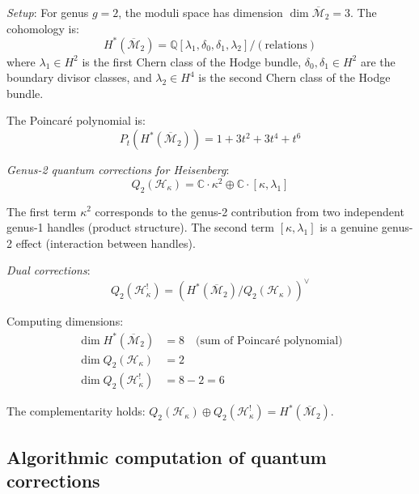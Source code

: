 \begin{example}
\label{ex:heisenberg-genus-2-complementarity}

\emph{Setup}: For genus $g=2$, the moduli space has dimension $\dim \overline{
\mathcal{M}}_2 = 3$. The cohomology is:
\begin{equation}
H^*(\overline{\mathcal{M}}_2) = \mathbb{Q}[\lambda_1, \delta_0, \delta_1, \lambda_2] / (\text{relations})
\end{equation}
where $\lambda_1 \in H^2$ is the first Chern class of the Hodge bundle,
$\delta_0, \delta_1 \in H^2$ are the boundary divisor classes, and
$\lambda_2 \in H^4$ is the second Chern class of the Hodge bundle.

The Poincaré polynomial is:
\begin{equation}
P_t(H^*(\overline{\mathcal{M}}_2)) = 1 + 3t^2 + 3t^4 + t^6
\end{equation}

\emph{Genus-2 quantum corrections for Heisenberg}:
\begin{equation}
Q_2(\mathcal{H}_\kappa) = \mathbb{C} \cdot \kappa^2 \oplus \mathbb{C} \cdot [\kappa, 
\lambda_1]
\end{equation}

The first term $\kappa^2$ corresponds to the genus-2 contribution from two independent 
genus-1 handles (product structure). The second term $[\kappa, \lambda_1]$ is a 
genuine genus-2 effect (interaction between handles).

\emph{Dual corrections}:
\begin{equation}
Q_2(\mathcal{H}_\kappa^!) = \left(H^*(\overline{\mathcal{M}}_2) / Q_2(\mathcal{H}_\kappa)
\right)^\vee
\end{equation}

Computing dimensions:
\begin{align}
\dim H^*(\overline{\mathcal{M}}_2) &= 8 \quad \text{(sum of Poincaré polynomial)}\\
\dim Q_2(\mathcal{H}_\kappa) &= 2\\
\dim Q_2(\mathcal{H}_\kappa^!) &= 8 - 2 = 6
\end{align}

The complementarity holds: $Q_2(\mathcal{H}_\kappa) \oplus Q_2(\mathcal{H}_\kappa^!) 
= H^*(\overline{\mathcal{M}}_2)$.
\end{example}

\subsection{Algorithmic computation of quantum corrections}

